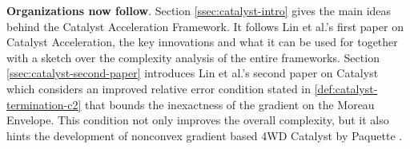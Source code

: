 \documentclass[12pt]{article}
\begin{document}
    \textbf{Organizations now follow}. 
    Section \ref{ssec:catalyst-intro} gives the main ideas behind the Catalyst Acceleration Framework. 
    It follows Lin et al.'s first paper \cite{lin_universal_2015} on Catalyst Acceleration, the key innovations and what it can be used for together with a sketch over the complexity analysis of the entire frameworks. 
    Section \ref{ssec:catalyst-second-paper} introduces Lin et al.'s second paper \cite{lin_catalyst_2018} on Catalyst which considers an improved relative error condition stated in \ref{def:catalyst-termination-c2} that bounds the inexactness of the gradient on the Moreau Envelope. 
    This condition not only improves the overall complexity, but it also hints the development of nonconvex gradient based 4WD Catalyst by Paquette \cite{paquette_catalyst_2018}. 
    
\end{document}
